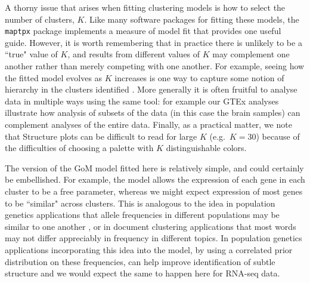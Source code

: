 \documentclass[10pt,letterpaper]{article}
\begin{document}
A thorny issue that arises when fitting clustering models is how to select the number of clusters, $K$. Like many software packages
for fitting these models, the {\tt maptpx} package implements a measure of model fit that provides one useful guide. However, it is
worth remembering that in practice there is unlikely to be a ``true" value of $K$, and results from different
values of $K$ may complement one another rather than merely competing with one another. For example, seeing how the fitted model evolves
as $K$ increases is one way to capture some notion of hierarchy in the clusters identified \cite{Rosenberg2002}. More generally it is often
fruitful to analyse data in multiple ways using the same tool: for example our GTEx analyses illustrate how
analysis of subsets of the data (in this case the brain samples) can complement analyses of the entire data. Finally, as a practical matter,
we note that Structure plots can be difficult to read for large $K$ (e.g.~$K=30$) because of the difficulties of choosing a palette with $K$ distinguishable colors.

The version of the GoM model fitted here is relatively simple, and could certainly be embellished. For example, the model allows the expression of each gene in each cluster to be a free parameter, whereas we might expect expression of most
genes to be ``similar" across clusters. This is analogous to the idea in population genetics applications that allele frequencies in different populations may
be similar to one another \cite{Falush2003}, or in document clustering applications that most words may not differ appreciably in frequency in different topics.
In population genetics applications incorporating this idea into the model, by using a correlated prior distribution on these frequencies,
can help improve identification of subtle structure \cite{Falush2003} and we would expect the same to happen here for RNA-seq data.
\end{document}
